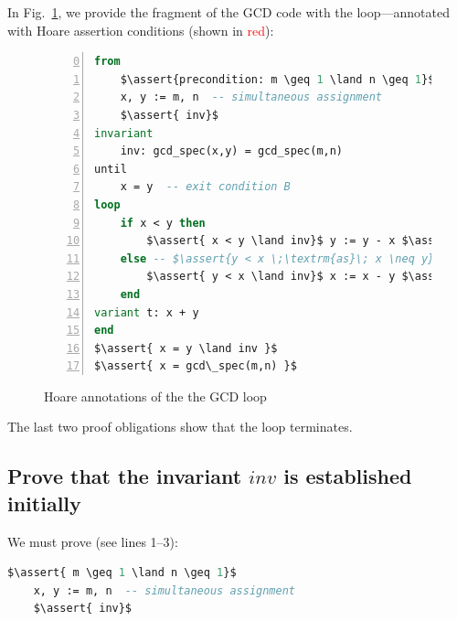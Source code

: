 \documentclass[runningheads,12pt]{article}
\newcommand{\e}[1]{\lstinline[language=eiffel]|#1|}
\def\assert#1{\textcolor{red}{ {\{} {#1} {\}}}}
\begin{document}
In Fig.~\ref{fig:gcd-loop}, we provide the fragment of the GCD code with the loop---annotated with Hoare assertion conditions (shown in \textcolor{red}{red}): 

\begin{figure}[!htb]
\begin{framed}
	\caption{Hoare annotations of the the GCD loop}
\label{fig:gcd-loop}
\begin{lstlisting}[language=eiffel,numbers=left,firstnumber=0]
from
	$\assert{precondition: m \geq 1 \land n \geq 1}$
	x, y := m, n  -- simultaneous assignment
	$\assert{ inv}$
invariant 
	inv: gcd_spec(x,y) = gcd_spec(m,n)
until
	x = y  -- exit condition B
loop
	if x < y then
		$\assert{ x < y \land inv}$ y := y - x $\assert{ inv}$
	else -- $\assert{y < x \;\textrm{as}\; x \neq y}$
		$\assert{ y < x \land inv}$ x := x - y $\assert{ inv}$
	end
variant t: x + y
end
$\assert{ x = y \land inv }$
$\assert{ x = gcd\_spec(m,n) }$
\end{lstlisting}
\end{framed}
\end{figure}


%

The last two proof obligations show that the loop terminates. 

\subsection{Prove that the invariant $inv$ is established initially}

We must prove (see lines 1--3):


\begin{lstlisting}[language=eiffel]
    $\assert{ m \geq 1 \land n \geq 1}$
    x, y := m, n  -- simultaneous assignment
    $\assert{ inv}$
\end{lstlisting} 
\end{document}
